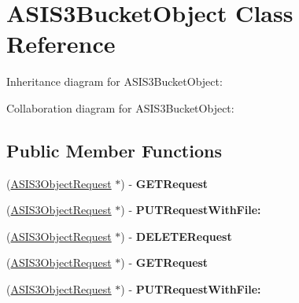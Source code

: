 \hypertarget{interface_a_s_i_s3_bucket_object}{
\section{\-A\-S\-I\-S3\-Bucket\-Object \-Class \-Reference}
\label{interface_a_s_i_s3_bucket_object}
}


\-Inheritance diagram for \-A\-S\-I\-S3\-Bucket\-Object\-:


\-Collaboration diagram for \-A\-S\-I\-S3\-Bucket\-Object\-:
\subsection*{\-Public \-Member \-Functions}
\begin{DoxyCompactItemize}
\item 
\hypertarget{interface_a_s_i_s3_bucket_object_a1f733d63bfbf3626a1a826a6bf5be6f5}{
(\hyperlink{interface_a_s_i_s3_object_request}{\-A\-S\-I\-S3\-Object\-Request} $\ast$) -\/ {\bfseries \-G\-E\-T\-Request}}
\label{interface_a_s_i_s3_bucket_object_a1f733d63bfbf3626a1a826a6bf5be6f5}

\item 
\hypertarget{interface_a_s_i_s3_bucket_object_a8543a1f934a036d41bda70b22510217f}{
(\hyperlink{interface_a_s_i_s3_object_request}{\-A\-S\-I\-S3\-Object\-Request} $\ast$) -\/ {\bfseries \-P\-U\-T\-Request\-With\-File\-:}}
\label{interface_a_s_i_s3_bucket_object_a8543a1f934a036d41bda70b22510217f}

\item 
\hypertarget{interface_a_s_i_s3_bucket_object_a1758e5b65f690d1c4f7d5beb262c630b}{
(\hyperlink{interface_a_s_i_s3_object_request}{\-A\-S\-I\-S3\-Object\-Request} $\ast$) -\/ {\bfseries \-D\-E\-L\-E\-T\-E\-Request}}
\label{interface_a_s_i_s3_bucket_object_a1758e5b65f690d1c4f7d5beb262c630b}

\item 
\hypertarget{interface_a_s_i_s3_bucket_object_a1f733d63bfbf3626a1a826a6bf5be6f5}{
(\hyperlink{interface_a_s_i_s3_object_request}{\-A\-S\-I\-S3\-Object\-Request} $\ast$) -\/ {\bfseries \-G\-E\-T\-Request}}
\label{interface_a_s_i_s3_bucket_object_a1f733d63bfbf3626a1a826a6bf5be6f5}

\item 
\hypertarget{interface_a_s_i_s3_bucket_object_a8543a1f934a036d41bda70b22510217f}{
(\hyperlink{interface_a_s_i_s3_object_request}{\-A\-S\-I\-S3\-Object\-Request} $\ast$) -\/ {\bfseries \-P\-U\-T\-Request\-With\-File\-:}}
\label{interface_a_s_i_s3_bucket_object_a8543a1f934a036d41bda70b22510217f}


\end{DoxyCompactItemize}
